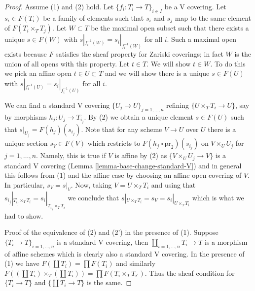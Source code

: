 \documentclass[10pt,a4paper]{amsart}
\theoremstyle{plain}
\theoremstyle{definition}
\theoremstyle{remark}
\numberwithin{equation}{subsection}
\begin{document}
\begin{proof}
Assume (1) and (2) hold.
Let $\{f_i : T_i \to T\}_{i \in I}$ be a V covering. Let $s_i \in F(T_i)$
be a family of elements such that $s_i$ and $s_j$ map to the same element
of $F(T_i \times_T T_j)$. Let $W \subset T$ be the maximal open subset
such that there exists a unique $s \in F(W)$ with
$s|_{f_i^{-1}(W)} = s_i|_{f_i^{-1}(W)}$ for all $i$.
Such a maximal open exists because $F$ satisfies the
sheaf property for Zariski coverings; in fact $W$ is the
union of all opens with this property. Let $t \in T$.
We will show $t \in W$. To do this we pick an affine open
$t \in U \subset T$ and we will show there is a unique
$s \in F(U)$ with
$s|_{f_i^{-1}(U)} = s_i|_{f_i^{-1}(U)}$ for all $i$.

\medskip\noindent
We can find a standard V covering
$\{U_j \to U\}_{j = 1, \ldots, n}$ refining $\{U \times_T T_i \to U\}$,
say by morphisms $h_j : U_j \to T_{i_j}$. By (2) we obtain a unique element
$s \in F(U)$ such that $s|_{U_j} = F(h_j)(s_{i_j})$. Note that for any
scheme $V \to U$ over $U$ there is a unique section $s_V \in F(V)$
which restricts to $F(h_j \circ \text{pr}_2)(s_{i_j})$ on
$V \times_U U_j$ for $j = 1, \ldots, n$. Namely, this is true if $V$
is affine by (2) as $\{V \times_U U_j \to V\}$ is a standard V covering
(Lemma \ref{lemma-base-change-standard-V})
and in general this follows from (1) and the affine case by choosing an
affine open covering of $V$. In particular, $s_V = s|_V$.
Now, taking $V = U \times_T T_i$ and using that
$s_{i_j}|_{T_{i_j} \times_T T_i} = s_i|_{T_{i_j} \times_T T_i}$
we conclude that $s|_{U \times_T T_i} = s_V = s_i|_{U \times_T T_i}$
which is what we had to show.

\medskip\noindent
Proof of the equivalence of (2) and (2') in the presence of (1).
Suppose $\{T_i \to T\}_{i = 1, \ldots, n}$ is a standard V covering, then
$\coprod_{i = 1, \ldots, n} T_i \to T$ is a morphism of affine schemes
which is clearly also a standard V covering.
In the presence of (1) we have $F(\coprod T_i) = \prod F(T_i)$
and similarly
$F((\coprod T_i) \times_T (\coprod T_i)) = \prod F(T_i \times_T T_{i'})$.
Thus the sheaf condition for $\{T_i \to T\}$ and $\{\coprod T_i \to T\}$
is the same.
\end{proof}
\end{document}
